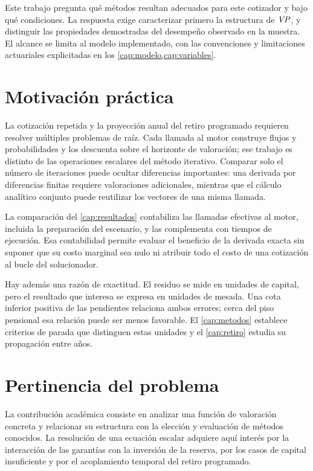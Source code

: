 Este trabajo pregunta qué métodos resultan adecuados para este cotizador y bajo
qué condiciones. La respuesta exige caracterizar primero la estructura de
$\mathit{VP}$, y distinguir las propiedades demostradas del desempeño observado en la
muestra. El alcance se limita al modelo implementado, con las convenciones y
limitaciones actuariales explicitadas en los \cref{cap:modelo,cap:variables}.

\section{Motivación práctica}

La cotización repetida y la proyección anual del retiro programado requieren
resolver múltiples problemas de raíz. Cada llamada al motor construye flujos y
probabilidades y los descuenta sobre el horizonte de valoración; ese trabajo es
distinto de las operaciones escalares del método iterativo. Comparar solo el
número de iteraciones puede ocultar diferencias importantes: una derivada por
diferencias finitas requiere valoraciones adicionales, mientras que el cálculo
analítico conjunto puede reutilizar los vectores de una misma llamada.

La comparación del \cref{cap:resultados} contabiliza las llamadas efectivas al
motor, incluida la preparación del escenario, y las complementa con tiempos de
ejecución. Esa contabilidad permite evaluar el beneficio de la derivada exacta sin
suponer que su costo marginal sea nulo ni atribuir todo el costo de una cotización
al bucle del solucionador.

Hay además una razón de exactitud. El residuo se mide en unidades de capital,
pero el resultado que interesa se expresa en unidades de mesada. Una cota inferior
positiva de las pendientes relaciona ambos errores; cerca del piso pensional esa
relación puede ser menos favorable. El \cref{cap:metodos} establece criterios de
parada que distinguen estas unidades y el \cref{cap:retiro} estudia su propagación
entre años.

\section{Pertinencia del problema}
\label{sec:pertinencia}

La contribución académica consiste en analizar una función de valoración concreta
y relacionar su estructura con la elección y evaluación de métodos conocidos. La
resolución de una ecuación escalar adquiere aquí interés por la interacción de
las garantías con la inversión de la reserva, por los casos de capital
insuficiente y por el acoplamiento temporal del retiro programado.

